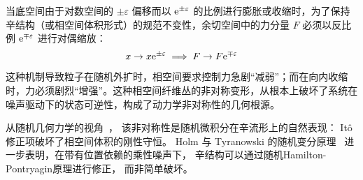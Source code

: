 ﻿\documentclass[10pt,a4paper]{article}
\begin{document}
当底空间由于对数空间的 $\pm\varepsilon$ 偏移而以 $\text e^{\pm\varepsilon}$ 的比例进行膨胀或收缩时，为了保持辛结构（或相空间体积形式）的规范不变性，余切空间中的力分量 $F$ 必须以反比例 $\text e^{\mp\varepsilon}$ 进行对偶缩放：
\begin{equation}
x \to x \text e^{\pm\varepsilon} \implies F \to F \text e^{\mp\varepsilon}
\end{equation}
这种机制导致粒子在随机外扩时，相空间要求控制力急剧“减弱”；而在向内收缩时，力必须剧烈“增强”。这种相空间纤维丛的非对称变形，从根本上破坏了系统在噪声驱动下的状态可逆性，构成了动力学非对称性的几何根源。

从随机几何力学的视角~\cite{Bismut1981}，
该非对称性是随机微积分在辛流形上的自然表现：
It\^{o} 修正项破坏了相空间体积的刚性守恒。
Holm 与 Tyranowski 的随机变分原理~\cite{HolmTyranowski2016}
进一步表明，在带有位置依赖的乘性噪声下，
辛结构可以通过随机Hamilton-Pontryagin原理进行修正，
而非简单破坏。



\printbibliography
\end{document}
